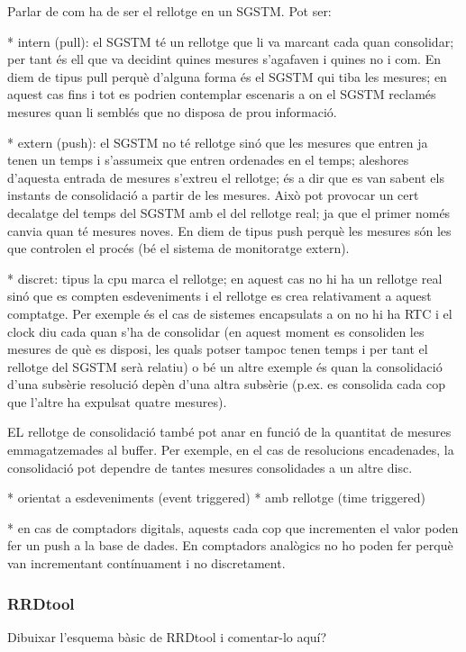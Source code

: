 Parlar de com ha de ser el rellotge en un SGSTM. Pot ser:

* intern (pull): el SGSTM té un rellotge que li va marcant cada quan consolidar; per tant és ell que va decidint quines mesures s'agafaven i quines no i com. En diem de tipus pull perquè d'alguna forma és el SGSTM qui tiba les mesures; en aquest cas fins i tot es podrien contemplar escenaris a on el SGSTM reclamés mesures quan li semblés que no disposa de prou informació.

* extern (push): el SGSTM no té rellotge sinó que les mesures que entren ja tenen un temps i s'assumeix que entren ordenades en el temps; aleshores d'aquesta entrada de mesures s'extreu el rellotge; és a dir que es van sabent els instants de consolidació a partir de les mesures. Això pot provocar un cert decalatge del temps del SGSTM amb el del rellotge real; ja que el primer només canvia quan té mesures noves. En diem de tipus push perquè les mesures són les que controlen el procés (bé el sistema de monitoratge extern). 

* discret: tipus la cpu marca el rellotge; en aquest cas no hi ha un rellotge real sinó que es compten esdeveniments i el rellotge es crea relativament a aquest comptatge. Per exemple és el cas de sistemes encapsulats a on no hi ha RTC i el clock diu cada quan s'ha de consolidar (en aquest moment es consoliden les mesures de què es disposi, les quals potser tampoc tenen temps i per tant el rellotge del SGSTM serà relatiu) o bé un altre exemple és quan la consolidació d'una subsèrie resolució depèn d'una altra subsèrie (p.ex. es consolida cada cop que l'altre ha expulsat quatre mesures).



EL rellotge de consolidació també pot anar en funció de la quantitat de mesures emmagatzemades al buffer.  Per exemple, en el cas de resolucions encadenades, la consolidació pot dependre de tantes mesures consolidades a un altre disc.



\todo{}
* orientat a esdeveniments (event triggered)
* amb rellotge (time triggered)

* en cas de comptadors digitals, aquests cada cop que incrementen el valor poden fer un push a la base de dades. En comptadors analògics no ho poden fer perquè van incrementant contínuament i no discretament.






\subsubsection{RRDtool}

Dibuixar l'esquema bàsic de RRDtool i comentar-lo aquí?











